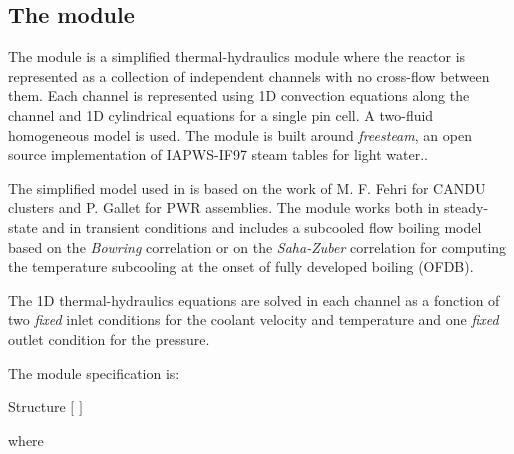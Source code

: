 \subsection{The  module}\label{sect:thm}

\vskip 0.2cm

The  module is a simplified thermal-hydraulics module where the
reactor is represented as a collection of independent channels with no
cross-flow between them. Each channel is represented using 1D convection
equations along the channel and 1D cylindrical equations for a single pin cell.
A two-fluid homogeneous model is used. The  module is built around {\sl freesteam},
an open source implementation of IAPWS-IF97 steam tables for light water.\cite{freesteam}.

\vskip 0.08cm

The simplified model used in   is based on the work of M. F. Fehri for CANDU clusters\cite{fehri} and P. Gallet
for PWR assemblies\cite{gallet}. The  module works both in steady-state and in transient conditions and includes
a subcooled flow boiling model based on the {\sl Bowring} correlation\cite{bowring} or on the {\sl Saha-Zuber}
correlation\cite{saha-zuber} for computing the temperature subcooling at the onset of fully developed boiling (OFDB).

\vskip 0.08cm

The 1D thermal-hydraulics equations are solved in each channel as a fonction of two
{\sl fixed} inlet conditions for the coolant velocity and temperature and one {\sl fixed} outlet condition for the pressure.

\vskip 0.1cm

\noindent
The  module specification is:

\begin{DataStructure}{Structure }
  \moc{:=} 
$[$  $]$  \moc{::} 
\end{DataStructure}

\noindent where

